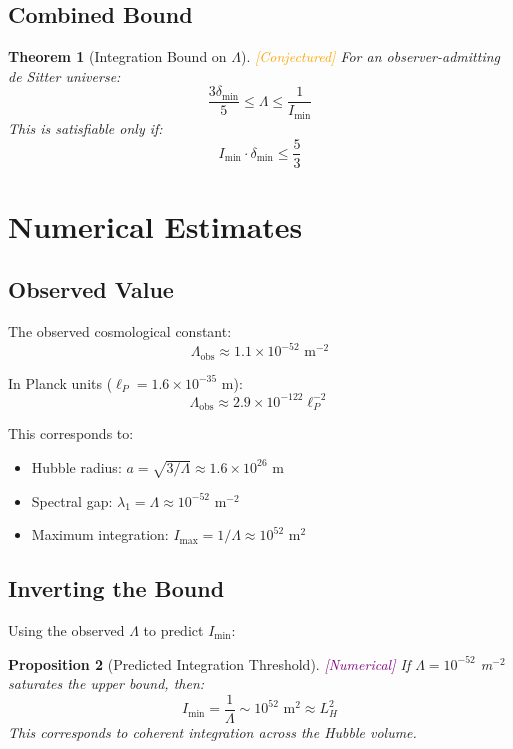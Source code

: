 \documentclass[11pt,a4paper]{article}
\theoremstyle{plain}
\newtheorem{theorem}{Theorem}[section]
\newtheorem{proposition}[theorem]{Proposition}
\theoremstyle{definition}
\theoremstyle{remark}
\newcommand{\conjectured}{\textcolor{orange}{[Conjectured]}}
\newcommand{\numerical}{\textcolor{purple}{[Numerical]}}
\begin{document}
\subsection{Combined Bound}

\begin{theorem}[Integration Bound on $\Lambda$] \conjectured
\label{thm:combined}
For an observer-admitting de Sitter universe:
\[
\frac{3\delta_{\min}}{5} \leq \Lambda \leq \frac{1}{I_{\min}}
\]
This is satisfiable only if:
\[
I_{\min} \cdot \delta_{\min} \leq \frac{5}{3}
\]
\end{theorem}

\section{Numerical Estimates}

\subsection{Observed Value}

The observed cosmological constant:
\[
\Lambda_{\text{obs}} \approx 1.1 \times 10^{-52} \text{ m}^{-2}
\]

In Planck units ($\ell_P = 1.6 \times 10^{-35}$ m):
\[
\Lambda_{\text{obs}} \approx 2.9 \times 10^{-122} \ell_P^{-2}
\]

This corresponds to:
\begin{itemize}[noitemsep]
    \item Hubble radius: $a = \sqrt{3/\Lambda} \approx 1.6 \times 10^{26}$ m
    \item Spectral gap: $\lambda_1 = \Lambda \approx 10^{-52}$ m$^{-2}$
    \item Maximum integration: $I_{\max} = 1/\Lambda \approx 10^{52}$ m$^{2}$
\end{itemize}

\subsection{Inverting the Bound}

Using the observed $\Lambda$ to predict $I_{\min}$:

\begin{proposition}[Predicted Integration Threshold] \numerical
If $\Lambda = 10^{-52}$ m$^{-2}$ saturates the upper bound, then:
\[
I_{\min} = \frac{1}{\Lambda} \sim 10^{52} \text{ m}^2 \approx L_H^2
\]
This corresponds to coherent integration across the Hubble volume.
\end{proposition}
\end{document}
